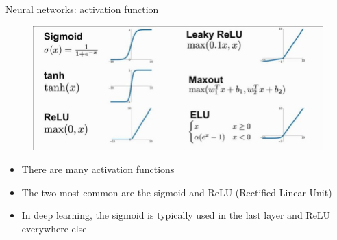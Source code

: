 \documentclass{beamer}
\begin{document}
\begin{frame}{Neural networks: activation function}

\begin{figure}
    \centering
    \includegraphics[scale=0.4]{images/Activation functions.png}
    \label{fig:my_label}
\end{figure}

\begin{itemize}
    \item There are many activation functions
    \item The two most common are the sigmoid and ReLU (Rectified Linear Unit)
    \item In deep learning, the sigmoid is typically used in the last layer and ReLU everywhere else
\end{itemize}
    
\end{frame}
\end{document}
